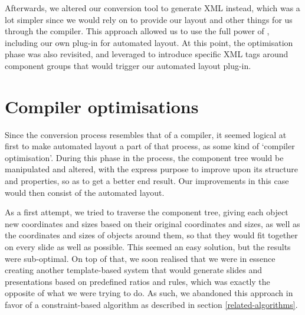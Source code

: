    Afterwards, we altered our conversion tool to generate \mxp XML instead,
   which was a lot simpler since we would rely on \mxp to provide our layout
   and other things for us through the \mxp compiler. This approach allowed us
   to use the full power of \mxp, including our own plug-in for automated
   layout. At this point, the optimisation phase was also revisited, and
   leveraged to introduce specific XML tags around component groups that would
   trigger our automated layout plug-in.

  \section{Compiler optimisations}
   \label{compiler-optimisations}

   Since the conversion process resembles that of a compiler, it seemed logical
   at first to make automated layout a part of that process, as some kind of
   `compiler optimisation'. During this phase in the process, the component
   tree would be manipulated and altered, with the express purpose to improve
   upon its structure and properties, so as to get a better end result. Our
   improvements in this case would then consist of the automated layout.

   As a first attempt, we tried to traverse the component tree, giving each
   object new coordinates and sizes based on their original coordinates and
   sizes, as well as the coordinates and sizes of objects around them, so that
   they would fit together on every slide as well as possible. This seemed an
   easy solution, but the results were sub-optimal. On top of that, we soon
   realised that we were in essence creating another template-based system that
   would generate slides and presentations based on predefined ratios and
   rules, which was exactly the opposite of what we were trying to do. As such,
   we abandoned this approach in favor of a constraint-based algorithm as
   described in section \ref{related-algorithms}.

